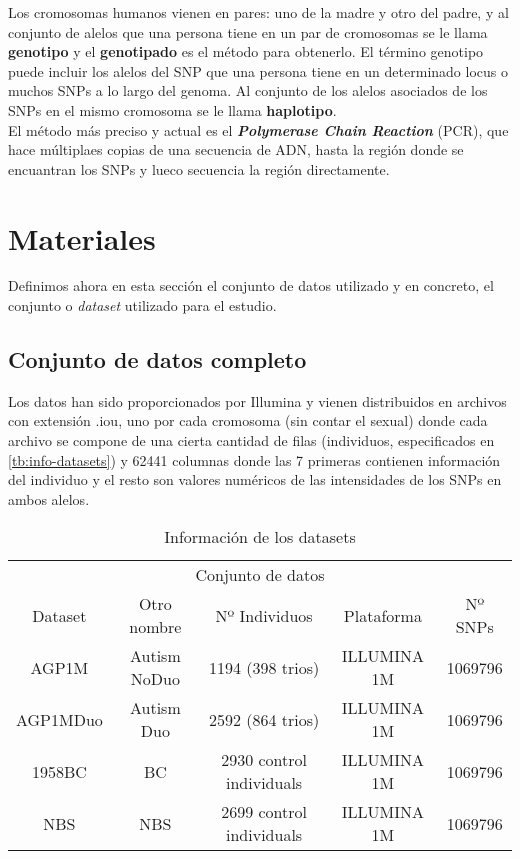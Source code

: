 Los cromosomas humanos vienen en pares: uno de la madre y otro del padre, y al conjunto de alelos que una persona tiene en un par de cromosomas se le llama \textbf{genotipo} y el \textbf{genotipado} es el método para obtenerlo. El término genotipo puede incluir los alelos del SNP que una persona tiene en un determinado locus o muchos SNPs a lo largo del genoma. Al conjunto de los alelos asociados de los SNPs en el mismo cromosoma se le llama \textbf{haplotipo}.\\
El método más preciso y actual es el \textbf{\textit{Polymerase Chain Reaction}} (PCR), que hace múltiplaes copias de una secuencia de ADN, hasta la región donde se encuantran los SNPs y lueco secuencia la región directamente.

\newpage
\section{Materiales}
Definimos ahora en esta sección el conjunto de datos utilizado y en concreto, el conjunto o \textit{dataset} utilizado para el estudio.
\subsection{Conjunto de datos completo}
Los datos han sido proporcionados por Illumina y vienen distribuidos en archivos con extensión .iou, uno por cada cromosoma (sin contar el sexual) donde cada archivo se compone de una cierta cantidad de filas (individuos, especificados en \autoref{tb:info-datasets}) y 62441 columnas donde las 7 primeras contienen información del individuo y el resto son valores numéricos de las intensidades de los SNPs en ambos alelos.

\begin{table}[htpb]
  \centering
  \begin{tabular}{ccccc} \toprule
    \multicolumn{5}{c}{Conjunto de datos} \\ \cmidrule(r){1-5}
    Dataset & Otro nombre & Nº Individuos & Plataforma & Nº SNPs          \\ \midrule
    AGP1M & Autism NoDuo & 1194 (398 trios) & ILLUMINA 1M & 1069796          \\ 
    AGP1MDuo & Autism Duo & 2592 (864 trios) & ILLUMINA 1M & 1069796          \\ 
    1958BC & BC & 2930 control individuals & ILLUMINA 1M & 1069796          \\
    NBS & NBS & 2699 control individuals & ILLUMINA 1M & 1069796          \\ \bottomrule
  \end{tabular}
  \caption{Información de los datasets}
  \label{tb:info-datasets}
\end{table}

